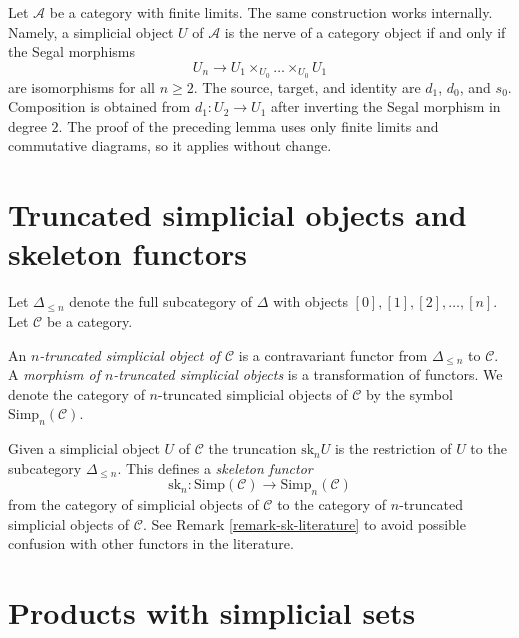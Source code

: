 \begin{remark}
\label{remark-internal-category-nerve}
Let $\mathcal{A}$ be a category with finite limits. The same construction
works internally. Namely, a simplicial object $U$ of $\mathcal{A}$ is the
nerve of a category object if and only if the Segal morphisms
$$
U_n \longrightarrow
U_1 \times_{U_0} \ldots \times_{U_0} U_1
$$
are isomorphisms for all $n \geq 2$. The source, target, and identity are
$d_1$, $d_0$, and $s_0$. Composition is obtained from $d_1 : U_2 \to U_1$
after inverting the Segal morphism in degree $2$. The proof of the preceding
lemma uses only finite limits and commutative diagrams, so it applies without
change.
\end{remark}



\section{Truncated simplicial objects and skeleton functors}
\label{section-skeleton}

\noindent
Let $\Delta_{\leq n}$ denote the full subcategory of
$\Delta$ with objects $[0], [1], [2], \ldots, [n]$.
Let $\mathcal{C}$ be a category.

\begin{definition}
\label{definition-truncated-simplicial-object}
An {\it $n$-truncated simplicial object of $\mathcal{C}$}
is a contravariant functor from $\Delta_{\leq n}$ to
$\mathcal{C}$. A {\it morphism of $n$-truncated
simplicial objects} is a transformation of functors.
We denote the category of $n$-truncated
simplicial objects of $\mathcal{C}$ by
the symbol $\text{Simp}_n(\mathcal{C})$.
\end{definition}

\noindent
Given a simplicial object $U$ of $\mathcal{C}$
the truncation $\text{sk}_n U$ is the restriction
of $U$ to the subcategory $\Delta_{\leq n}$.
This defines a {\it skeleton functor}
$$
\text{sk}_n :
\text{Simp}(\mathcal{C}) \longrightarrow \text{Simp}_n(\mathcal{C})
$$
from the category of simplicial objects of $\mathcal{C}$
to the category of $n$-truncated simplicial objects of $\mathcal{C}$.
See Remark \ref{remark-sk-literature} to avoid possible confusion
with other functors in the literature.




\section{Products with simplicial sets}
\label{section-product-with-simplicial-sets}

